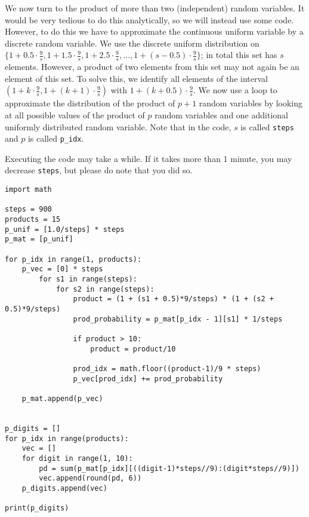 We now turn to the product of more than two (independent) random variables. It would be very tedious to do this analytically, so we will instead use some code. However, to do this we have to approximate the continuous uniform variable by a discrete random variable. We use the discrete uniform distribution on $\{1+ 0.5 \cdot \frac{9}{s}, 1 + 1.5 \cdot \frac{9}{s}, 1 + 2.5 \cdot \frac{9}{s}, \ldots, 1 + (s-0.5) \cdot \frac{9}{s}\}$; in total this set has $s$ elements. However, a product of two elements from this set may not again be an element of this set. To solve this, we identify all elements of the interval $\left(1+ k \cdot \frac{9}{s}, 1+ (k+1)\cdot \frac{9}{s}\right)$ with $1+ (k+0.5)\cdot \frac{9}{s}$. We now use a loop to approximate the distribution of the product of $p+1$ random variables by looking at  all possible values of the product of $p$ random variables and one additional uniformly distributed random variable. Note that in the code, $s$ is called \texttt{steps} and $p$ is  called \verb|p_idx|.

Executing the code may take a while. If it takes more than 1 minute, you may decrease \texttt{steps}, but please do note that you did so.

\begin{verbatim}
import math

steps = 900
products = 15
p_unif = [1.0/steps] * steps
p_mat = [p_unif]

for p_idx in range(1, products):
    p_vec = [0] * steps
        for s1 in range(steps):
            for s2 in range(steps):
                product = (1 + (s1 + 0.5)*9/steps) * (1 + (s2 + 0.5)*9/steps)
                prod_probability = p_mat[p_idx - 1][s1] * 1/steps

                if product > 10:
                    product = product/10

                prod_idx = math.floor((product-1)/9 * steps)
                p_vec[prod_idx] += prod_probability

    p_mat.append(p_vec)


p_digits = []
for p_idx in range(products):
    vec = []
    for digit in range(1, 10):
        pd = sum(p_mat[p_idx][((digit-1)*steps//9):(digit*steps//9)])
        vec.append(round(pd, 6))
    p_digits.append(vec)

print(p_digits)
\end{verbatim}


